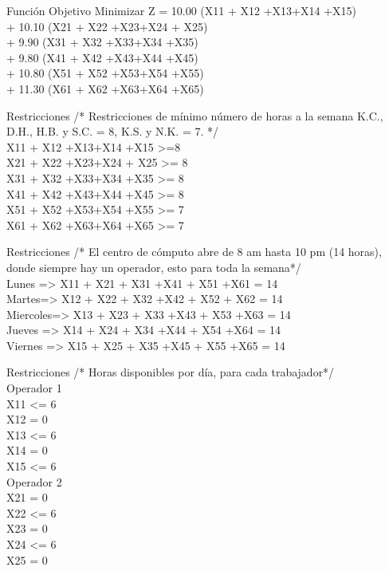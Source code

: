 \documentclass{beamer}
\begin{document}
\begin{frame}[fragile]{Función Objetivo}
Minimizar
Z = 10.00 (X11 + X12 +X13+X14 +X15) \\
+ 10.10 (X21 + X22 +X23+X24 + X25)\\
+  9.90 (X31 + X32 +X33+X34 +X35)\\
+ 9.80  (X41 + X42 +X43+X44 +X45)\\
+ 10.80  (X51 + X52 +X53+X54 +X55)\\
+ 11.30  (X61 + X62 +X63+X64 +X65)\\

\end{frame}

\begin{frame}[fragile]{Restricciones}
/* Restricciones  de mínimo número de horas a la semana K.C., D.H., H.B. y S.C. = 8, K.S. y N.K. = 7. */\\
X11 + X12 +X13+X14 +X15 >=8\\
X21 + X22 +X23+X24 + X25 >= 8\\
X31 + X32 +X33+X34 +X35 >= 8\\
X41 + X42 +X43+X44 +X45 >= 8\\
X51 + X52 +X53+X54 +X55 >= 7\\
X61 + X62 +X63+X64 +X65 >= 7\\
\end{frame}
\begin{frame}[fragile]{Restricciones}
/* El centro de cómputo abre de 8 am hasta 10 pm  (14 horas), donde siempre hay un operador, esto para toda la semana*/\\
Lunes => X11 + X21 + X31 +X41 + X51 +X61 = 14  \\
Martes=> X12 + X22 + X32 +X42 + X52 + X62 = 14\\
Miercoles=> X13 + X23 + X33 +X43 + X53 +X63 = 14\\
Jueves => X14 + X24 + X34 +X44 + X54 +X64 = 14\\
Viernes => X15 + X25 + X35 +X45 + X55 +X65 = 14  \\

\end{frame}
\begin{frame}[fragile]{Restricciones}
/* Horas disponibles por día, para cada trabajador*/\\
Operador 1\\
    X11 <= 6\\
    X12 = 0\\
    X13 <= 6\\
    X14  = 0\\
    X15 <= 6\\
Operador 2\\
    X21 = 0 \\
    X22 <= 6\\
    X23 = 0\\
    X24  <= 6\\
    X25 = 0\\
\end{frame}
\end{document}

